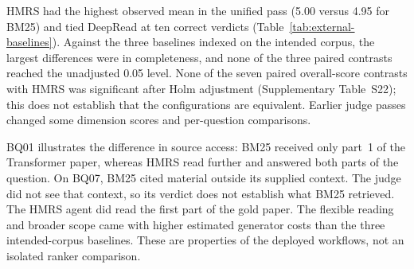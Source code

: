 HMRS had the highest observed mean in the unified pass (5.00 versus
4.95 for BM25) and tied DeepRead at ten correct verdicts
(Table~\ref{tab:external-baselines}). Against the three baselines indexed
on the intended corpus, the largest differences were in completeness,
and none of the three paired contrasts reached the unadjusted 0.05 level.
None of the seven paired overall-score contrasts with HMRS was significant
after Holm adjustment (Supplementary Table~S22); this does not establish
that the configurations are equivalent. Earlier judge passes changed some
dimension scores and per-question comparisons.

BQ01 illustrates the difference in source access: BM25 received only part~1
of the Transformer paper, whereas HMRS read further and answered both
parts of the question. On BQ07, BM25 cited material outside its supplied context. The judge
did not see that context, so its verdict does not establish what BM25
retrieved. The HMRS agent did read the first part of the gold
paper. The flexible reading and broader scope came with higher estimated
generator costs than the three intended-corpus baselines. These are
properties of the deployed workflows, not an isolated ranker comparison.
